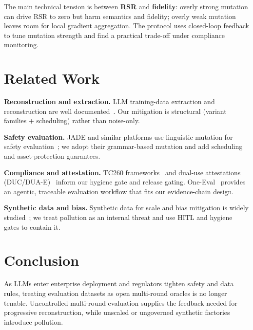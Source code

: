 \documentclass[letterpaper,twocolumn,10pt]{article}
\begin{document}
The main technical tension is between \textbf{RSR} and \textbf{fidelity}: overly strong mutation can drive RSR to zero but harm semantics and fidelity; overly weak mutation leaves room for local gradient aggregation. The protocol uses closed-loop feedback to tune mutation strength and find a practical trade-off under compliance monitoring.

\section{Related Work}

\textbf{Reconstruction and extraction.} LLM training-data extraction and reconstruction are well documented~\cite{llm-reconstruction-emergent,split-ft-attack,active-reconstruction,inadequacy-similarity-privacy}. Our mitigation is structural (variant families + scheduling) rather than noise-only.

\textbf{Safety evaluation.} JADE and similar platforms use linguistic mutation for safety evaluation~\cite{jade-linguistics,jade-db}; we adopt their grammar-based mutation and add scheduling and asset-protection guarantees.

\textbf{Compliance and attestation.} TC260 frameworks~\cite{tc260-governance,tc260-training-data} and dual-use attestations (DUC/DUA-E)~\cite{dual-use-attestations} inform our hygiene gate and release gating. One-Eval~\cite{one-eval} provides an agentic, traceable evaluation workflow that fits our evidence-chain design.

\textbf{Synthetic data and bias.} Synthetic data for scale and bias mitigation is widely studied~\cite{synthetic-data-privacy-bias,synthetic-bias-ml,bias-synthetic-review}; we treat pollution as an internal threat and use HITL and hygiene gates to contain it.

\section{Conclusion}

As LLMs enter enterprise deployment and regulators tighten safety and data rules, treating evaluation datasets as open multi-round oracles is no longer tenable. Uncontrolled multi-round evaluation supplies the feedback needed for progressive reconstruction, while unscaled or ungoverned synthetic factories introduce pollution.
\end{document}
